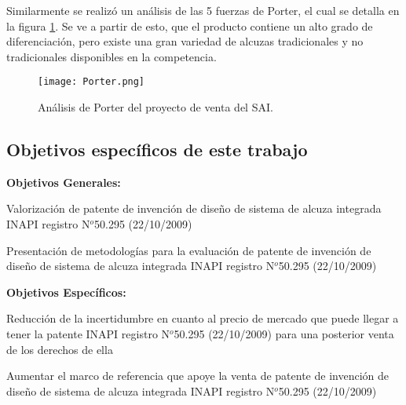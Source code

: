 Similarmente se realizó un análisis de las 5 fuerzas de Porter, el cual se detalla en la figura \ref{porter1}. Se ve a partir de esto, que el producto contiene un alto grado de diferenciación, pero existe una gran variedad de alcuzas tradicionales y no tradicionales disponibles en la competencia.

\begin{figure}
  \texttt{[image: Porter.png]}
  \caption{Análisis de Porter del proyecto de venta del SAI.}
  \label{porter1}
\end{figure}

\subsection{Objetivos específicos de este trabajo}
\textbf{Objetivos Generales:}

Valorización de patente de invención de diseño de sistema de alcuza integrada INAPI registro N$^o$50.295 (22/10/2009)

Presentación de metodologías para la evaluación de patente de invención de diseño de sistema de alcuza integrada INAPI registro N$^o$50.295 (22/10/2009)



\textbf{Objetivos Específicos:}

Reducción de la incertidumbre en cuanto al precio de mercado que puede llegar a tener la patente INAPI  registro N$^o$50.295 (22/10/2009) para una posterior venta de los derechos de ella

Aumentar el marco de referencia que apoye la venta de patente de invención de diseño de sistema de alcuza integrada INAPI registro N$^o$50.295 (22/10/2009)

